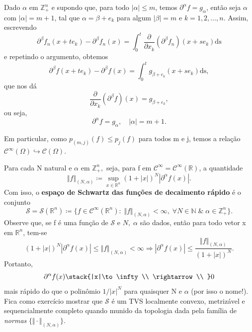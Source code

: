 \documentclass[../distribution_theory_notes.tex]{subfiles}
\begin{document}
  \begin{tcolorbox}[
  skin=enhanced,
  title=Observação,
  fonttitle=\bfseries,
colframe=black,
  colbacktitle=cyan!75!white, 
  colback=cyan!15,
  colbacklower=black,
coltitle=black,
  drop fuzzy shadow,
  ]
  Dado \(\alpha \) em \(\mathbb{Z}_{+}^{n}\) e supondo que, para todo \(|\alpha |\leq m\), temos \(\partial^{\alpha }f = g_{\alpha }\), então seja \(\alpha \) com \(|\alpha |=m+1\), tal que \(\alpha = \beta +e_{k}\) para algum \(|\beta |=m\) e \(k = 1,2,\dotsc ,n.\) Assim, escrevendo 
    \[
      \partial^{\beta }f_{n}(x+te_{k})-\partial^{\beta }f_{n}(x)=\int_{0}^{t}\frac{\partial^{}}{\partial x_{k}^{}}(\partial^{\beta }f_{n})(x+se_{k}) \mathrm{ds}
    \]
    e repetindo o argumento, obtemos 
      \[
        \partial^{\beta }f(x+te_{k})-\partial^{\beta }f(x)=\int_{0}^{t}g_{\beta +e_{k}}(x+se_{k}) \mathrm{ds},
      \]
      que nos dá 
        \[
          \frac{\partial^{}}{\partial x_{k}^{}}(\partial^{\beta }f)(x)=g_{\beta+e_{k}},
        \]
        ou seja, 
          \[
            \partial^{\alpha }f = g_{\alpha },\quad |\alpha |=m+1.
          \]

          Em particular, como \(p_{(m, j)}(f)\leq p_{j}(f)\) para todos m e j, temos a relação \(\mathcal{C}^{\infty}(\Omega )\hookrightarrow \mathcal{C}(\Omega )\).
  \end{tcolorbox}
  \begin{example}[O Espaço de Schwartz \(\mathcal{S}=\mathcal{S}(\mathbb{R}^{n})\)]
    Para cada N natural e \(\alpha \) em \(\mathbb{Z}_{+}^{n},\) seja, para f em \(\mathcal{C}^{\infty}=\mathcal{C}^{\infty}(\mathbb{R})\), a quantidade 
      \[
        \Vert f \Vert_{(N, \alpha )}\coloneqq \sup_{x\in \mathbb{R}^{n}}(1+|x|)^{N}|\partial^{\alpha }f(x)|.
      \]
      Com isso, o \textbf{espaço de Schwartz das funções de decaimento rápido} é o conjunto 
        \[
          \mathcal{S}=\mathcal{S}(\mathbb{R}^{n})\coloneqq \{f\in \mathcal{C}^{\infty}(\mathbb{R}^{n}):\; \Vert f \Vert_{(N, \alpha )}<\infty,\; \forall N\in \mathbb{N}\;\&\; \alpha \in \mathbb{Z}_{+}^{n}\}.
        \]
        Observe que, se f é uma função de \(\mathcal{S}\) e \(N,\; \alpha \) são dados, então para todo vetor x em \(\mathbb{R}^{n}\), tem-se 
          \[
            (1+|x|)^{N}|\partial^{\alpha }f(x)|\leq  \Vert f \Vert_{(N, \alpha )}<\infty \Rightarrow |\partial^{\alpha }f(x)|\leq \frac{\Vert f \Vert_{(N, \alpha )}}{(1+|x|)^{N}}.
          \]
          Portanto, 
            \[
              \partial^{\alpha }f(x)\stack{|x|\to \infty \\ \rightarrow \\ }0
            \]
            mais rápido do que o polinômio \(1/|x|^{N}\) para quaisquer N e \(\alpha \) (por isso o nome!). Fica como exercício mostrar que \(\mathcal{S}\) é um TVS localmente convexo, metrizável e sequencialmente completo quando munido da topologia dada pela família de \textit{normas} \(\{\Vert \cdot  \Vert_{(N, \alpha )}\}\).
 \end{example}
\end{document}
